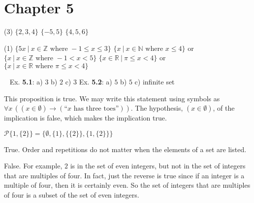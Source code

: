     \section*{Chapter 5}
\begin{Solution}{5.1}
\quad
    \begin{tasks}(3)
	\task $\{2,3,4\}$
	\task$\{-5,5\}$
	\task $\{4,5,6\}$
    \end{tasks}
\end{Solution}
\begin{Solution}{5.2}
\quad
    \begin{tasks}(1)
	\task $\{5x ~|~ x\in\mathbb{Z} \text{ where } -1\leq x \leq 3\}$
	\task $\{x ~|~x\in \mathbb{N} \text{ where } x\leq4\}$ or $\{x ~|~ x\in \mathbb{Z} \text{ where } -1<x<5\}$
	\task $\{x\in \mathbb{R} ~|~\pi \leq x<4\}$ or $\{x ~|~ x\in \mathbb{R} \text{ where } \pi \leq x < 4 \}$
    \end{tasks}
\end{Solution}
\begin{Solution}{5.3}
{\ }
Ex. \textbf{5.1}: a) $3$ \quad b) $2$ \quad c) $3$ \qquad
Ex. \textbf{5.2}: a) $5$ \quad b) $5$ \quad c) infinite set
\end{Solution}
\begin{Solution}{5.4}
\quad
This proposition is true. We may write this statement using symbols as $\forall{x}\,( (x\in\emptyset) \to (\text{``$x$ has three toes''}))$. The hypothesis,
$(x \in \emptyset)$, of the implication is false, which makes the implication true.
\end{Solution}
\begin{Solution}{5.5}
\quad
$\mathcal{ P} \{1, \{2\}\}=\{\emptyset, \{1\},\{\{2\}\},\{1,\{2\}\}\}$
\end{Solution}

\begin{Solution}{5.6}
True. Order and repetitions do not matter when the elements of a set are listed.
\end{Solution}

\begin{Solution}{5.7}
False. For example, $2$ is in the set of even integers, but not in the set of integers that are multiples of four. In fact, just the reverse is
true since if an integer is a multiple of four, then it is certainly even. So the set of integers that are multiples of four is a subset 
of the set of even integers.
\end{Solution}



